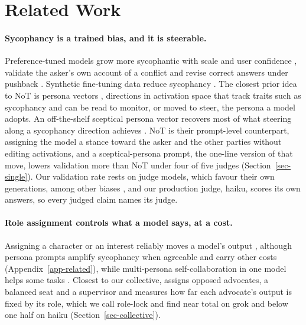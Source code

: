 \section{Related Work}
\label{sec-related}

\paragraph{Sycophancy is a trained bias, and it is steerable.}
Preference-tuned models grow more sycophantic with scale and user confidence
\citep{perez2023discovering,sharma23}, validate the asker's own account of a
conflict \citep{cheng25elephant} and revise correct answers under pushback
\citep{fanous2025syceval,malmqvist24}. Synthetic fine-tuning data reduce
sycophancy \citep{wei2023synthetic}. The closest prior idea to NoT is
persona vectors \citep{chen2025persona}, directions in activation space that
track traits such as sycophancy and can be read to monitor, or
moved to steer, the persona a model adopts. An off-the-shelf sceptical
persona vector recovers most of what steering along a sycophancy direction
\citep{rimsky2024caa} achieves \citep{kelkar2026devil}. NoT is their
prompt-level counterpart, assigning the model a stance toward the asker and
the other parties without editing activations, and a sceptical-persona
prompt, the one-line version of that move, lowers validation more than NoT
under four of five judges (Section~\ref{sec-single}).
Our validation rate rests on judge models, which favour their own
generations, among other biases
\citep{panickssery2024selfrecognition,wataoka2024selfpreference,zheng2023judging},
and our production judge, haiku, scores its own answers, so every judged claim
names its judge.

\paragraph{Role assignment controls what a model says, at a cost.}
Assigning a character or an interest reliably moves a model's output
\citep{shanahan2023roleplay,li2023camel}, although persona prompts amplify sycophancy when
agreeable \citep{shah2026toonice} and carry other costs (Appendix~\ref{app-related}),
while multi-persona self-collaboration in one
model helps some tasks \citep{wang2024spp}. Closest to our
collective, \citet{dietrich2026roles} assigns opposed advocates, a balanced
seat and a supervisor and measures how far each advocate's output is fixed by
its role, which we call role-lock and find near total on grok and below one
half on haiku (Section~\ref{sec-collective}).

